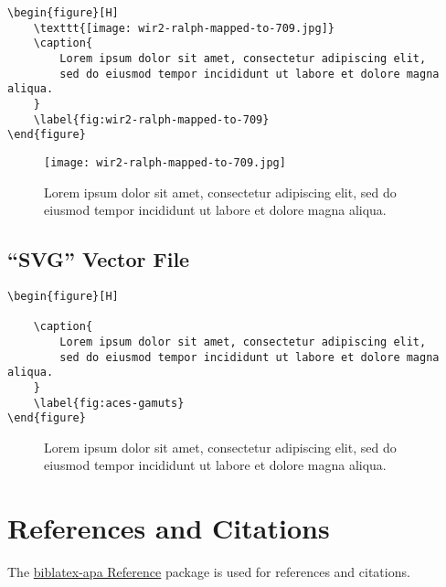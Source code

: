 \begin{lstlisting}[caption={Embedding a ``JPG'' raster file.}]
\begin{figure}[H]
    \texttt{[image: wir2-ralph-mapped-to-709.jpg]}
    \caption{
        Lorem ipsum dolor sit amet, consectetur adipiscing elit,
        sed do eiusmod tempor incididunt ut labore et dolore magna aliqua.
    }
    \label{fig:wir2-ralph-mapped-to-709}
\end{figure}
\end{lstlisting}

\begin{figure}[H]
    \texttt{[image: wir2-ralph-mapped-to-709.jpg]}
    \caption{
        Lorem ipsum dolor sit amet, consectetur adipiscing elit,
        sed do eiusmod tempor incididunt ut labore et dolore magna aliqua.
    }
    \label{fig:wir2-ralph-mapped-to-709}
\end{figure}

\subsection*{``SVG'' Vector File}
\label{subsec:svg-vector-file}

\begin{lstlisting}[caption={Embedding a ``SVG'' vector file.}]
\begin{figure}[H]
    
    \caption{
        Lorem ipsum dolor sit amet, consectetur adipiscing elit,
        sed do eiusmod tempor incididunt ut labore et dolore magna aliqua.
    }
    \label{fig:aces-gamuts}
\end{figure}
\end{lstlisting}

\begin{figure}[H]
    
    \caption{
        Lorem ipsum dolor sit amet, consectetur adipiscing elit,
        sed do eiusmod tempor incididunt ut labore et dolore magna aliqua.
    }
    \label{fig:aces-gamuts}
\end{figure}

\section*{References and Citations}
\label{sec:references-and-citations}

The \href{https://ctan.org/pkg/biblatex-apa}{biblatex-apa Reference}
package is used for references and citations.


